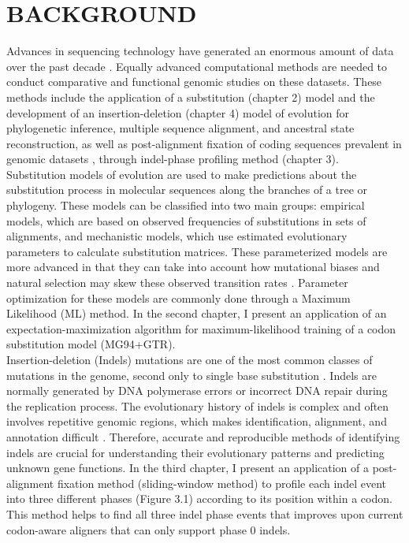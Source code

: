 \chapter{\normalfont BACKGROUND}
Advances in sequencing technology have generated an enormous amount of data over the past decade \parencite{van2014ten}. Equally advanced computational methods are needed to conduct comparative and functional genomic studies on these datasets. These methods include the application of a substitution (chapter 2) model and the development of an insertion-deletion (chapter 4) model of evolution for phylogenetic inference, multiple sequence alignment, and ancestral state reconstruction, as well as post-alignment fixation of coding sequences prevalent in genomic datasets \parencite{ranwez2011macse}, through indel-phase profiling method (chapter 3).  \\
\indent Substitution models of evolution are used to make predictions about the substitution process in molecular sequences along the branches of a tree or phylogeny. These models can be classified into two main groups: empirical models, which are based on observed frequencies of substitutions in sets of alignments, and mechanistic models, which use estimated evolutionary parameters to calculate substitution matrices. These parameterized models are more advanced in that they can take into account how mutational biases and natural selection may skew these observed transition rates \parencite{yang2008mutation}. Parameter optimization for these models are commonly done through a Maximum Likelihood (ML) method. In the second chapter, I present an application of an expectation-maximization algorithm for maximum-likelihood training of a codon substitution model (MG94+GTR).  \\
\indent Insertion-deletion (Indels) mutations are one of the most common classes of mutations in the genome, second only to single base substitution \parencite{taylor2004occurrence}. Indels are normally generated by DNA polymerase errors or incorrect DNA repair during the replication process. The evolutionary history of indels is complex and often involves repetitive genomic regions, which makes identification, alignment, and annotation difficult \parencite{kunkel2004dna}. Therefore, accurate and reproducible methods of identifying indels are crucial for understanding their evolutionary patterns and predicting unknown gene functions. In the third chapter, I present an application of a post-alignment fixation method (sliding-window method) to profile each indel event into three different phases (Figure 3.1) according to its position within a codon. This method helps to find all three indel phase events that improves upon current codon-aware aligners that can only support phase 0 indels. \\
